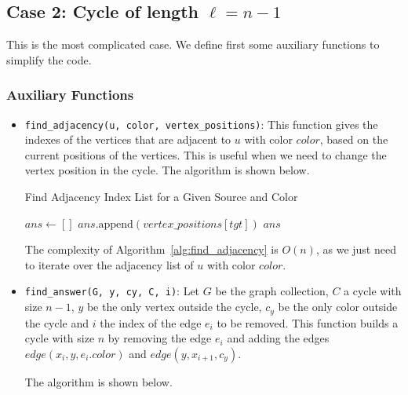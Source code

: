 \subsection{Case 2: Cycle of length \( \ell = n - 1 \)}

This is the most complicated case. We define first some auxiliary functions
to simplify the code.

\subsubsection{Auxiliary Functions}

\begin{itemize}
    \item \texttt{find\_adjacency(u, color, vertex\_positions)}: This function gives the indexes of the 
    vertices that are adjacent to $u$ with color $color$, based on the current 
    positions of the vertices. This is useful when we need to change the vertex position in the cycle.
    The algorithm is shown below.

    \begin{algorithm}
        \caption{Find Adjacency Index List for a Given Source and Color}
        \label{alg:find_adjacency}
        \begin{algorithmic}[1]
                \State $ans \gets []$
                    \State $ans.\text{append}(vertex\_positions[tgt])$
                \EndFor
                \State \Return $ans$ 
            \EndFunction
        \end{algorithmic}
    \end{algorithm}

    The complexity of Algorithm~\ref{alg:find_adjacency} is $O(n)$, as we just need to iterate over the adjacency list of $u$ with color $color$.

    \item \texttt{find\_answer(G, y, cy, C, i)}: Let $G$ be the graph collection, $C$ a cycle with
    size $n-1$, $y$ be the only vertex outside the cycle, $c_y$ be the only color
    outside the cycle and $i$ the index of the edge $e_i$ to be removed. This function 
    builds a cycle with size $n$ by removing the edge $e_i$ and adding the edges
    $edge(x_{i}, y, e_i.color)$ and $edge(y, x_{i+1}, c_y)$.

    The algorithm is shown below.


\end{itemize}
